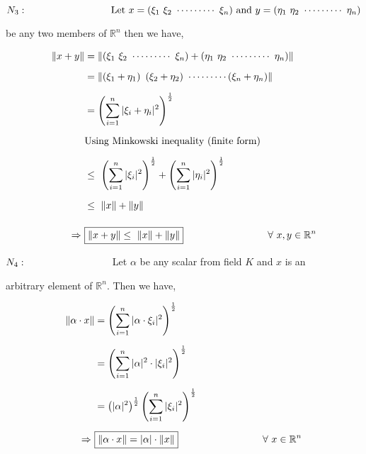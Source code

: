 \documentclass[a4paper,12pt]{article}
\begin{document}
    \pagebreak

    \vspace*{0.3cm}

    \begin{center}
        $N_3:\hspace*{3cm} \mbox{Let $x = \left(\xi_1\ \xi_2\ \cdots \cdots \cdots\ \xi_n\right)$ and $y = \left(\eta_1\ \eta_2\ \cdots \cdots \cdots\ \eta_n\right)$}$
        
        be any two members of $\mathbb{R}^n$ then we have,
    \end{center}

    \begin{equation*}
        \begin{split}
            \norm{x + y} & = \norm{\left(\xi_1\ \xi_2\ \cdots \cdots \cdots\ \xi_n\right) + \left(\eta_1\ \eta_2\ \cdots \cdots \cdots\ \eta_n\right)}\\[2mm]
            & = \norm{\left(\xi_1 + \eta_1\right)\ \left(\xi_2 + \eta_2\right)\ \cdots \cdots \cdots \left(\xi_n + \eta_n\right)}\\[2mm]
            & = \left(\sum_{i=1}^{n} |\xi_i + \eta_i|^2\right)^{\frac{1}{2}}\\[2mm]
            & \mbox{Using Minkowski inequality (finite form)}\\[2mm]
            & \leq\ \left(\sum_{i=1}^{n} |\xi_i|^2\right)^{\frac{1}{2}} + \left(\sum_{i=1}^{n} |\eta_i|^2\right)^{\frac{1}{2}}\\[2mm]
            & \leq\ \norm{x} + \norm{y}\\[4mm]
            \Rightarrow\ & \boxed{\norm{x + y}  \leq\ \norm{x} + \norm{y}} \hspace*{3cm} \forall\ x,y\in \mathbb{R}^n
        \end{split}
    \end{equation*}

    \vspace*{1cm}

    \begin{center}
        $N_4:\hspace*{3cm}$ 
        Let $\alpha$ be any scalar from field $K$ and $x$ is an
        
        arbitrary element of $\mathbb{R}^n$. Then we have,
    \end{center}
       

    \begin{equation*}
        \begin{split}
            \norm{\alpha \cdot x} & = \left(\sum_{i=1}^{n} |\alpha \cdot \xi_i|^2\right)^\frac{1}{2}\\[2mm]
            & = \left(\sum_{i=1}^{n} |\alpha|^2 \cdot |\xi_i|^2\right)^\frac{1}{2}\\[2mm]
            & = \left(|\alpha|^2\right)^\frac{1}{2} \left(\sum_{i=1}^{n}  |\xi_i|^2\right)^\frac{1}{2}\\[2mm]
            \Rightarrow\ & \boxed{\norm{\alpha \cdot x} = |\alpha| \cdot \norm{x}} \hspace*{3cm} \forall\ x\in \mathbb{R}^n
        \end{split}
    \end{equation*}
\end{document}
